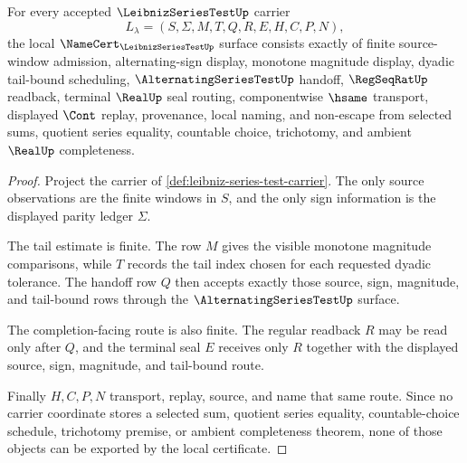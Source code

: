 \begin{theorem}
\label{thm:leibniz-series-test-namecert-obligations}
For every accepted $\LeibnizSeriesTestUp$ carrier
$$
L_{\lambda}=(S,\Sigma,M,T,Q,R,E,H,C,P,N),
$$
the local $\NameCert_{\LeibnizSeriesTestUp}$ surface consists exactly of finite source-window admission, alternating-sign display, monotone magnitude display, dyadic tail-bound scheduling, $\AlternatingSeriesTestUp$ handoff, $\RegSeqRatUp$ readback, terminal $\RealUp$ seal routing, componentwise $\hsame$ transport, displayed $\Cont$ replay, provenance, local naming, and non-escape from selected sums, quotient series equality, countable choice, trichotomy, and ambient $\RealUp$ completeness.
\end{theorem}
\begin{proof}
Project the carrier of \autoref{def:leibniz-series-test-carrier}. The only source observations are the finite windows in $S$, and the only sign information is the displayed parity ledger $\Sigma$.

The tail estimate is finite. The row $M$ gives the visible monotone magnitude comparisons, while $T$ records the tail index chosen for each requested dyadic tolerance. The handoff row $Q$ then accepts exactly those source, sign, magnitude, and tail-bound rows through the $\AlternatingSeriesTestUp$ surface.

The completion-facing route is also finite. The regular readback $R$ may be read only after $Q$, and the terminal seal $E$ receives only $R$ together with the displayed source, sign, magnitude, and tail-bound route.

Finally $H,C,P,N$ transport, replay, source, and name that same route. Since no carrier coordinate stores a selected sum, quotient series equality, countable-choice schedule, trichotomy premise, or ambient completeness theorem, none of those objects can be exported by the local certificate.
\end{proof}

